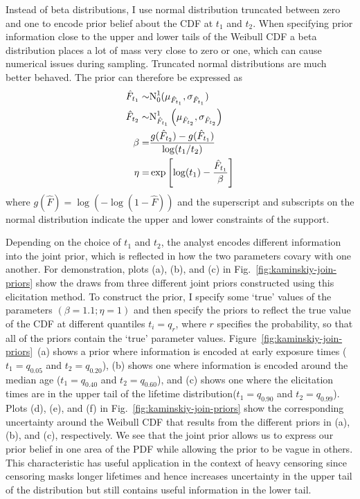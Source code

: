 Instead of beta distributions, I use normal distribution truncated between zero and one to encode prior belief about the CDF at $t_1$ and $t_2$. When specifying prior information close to the upper and lower tails of the Weibull CDF a beta distribution places a lot of mass very close to zero or one, which can cause numerical issues during sampling. Truncated normal distributions are much better behaved. The prior can therefore be expressed as
\begin{align*}
    \hat{F}_{t_1} \sim & \hbox{N}^{1}_{0}(\mu_{\hat{F}_{t_1}}, \sigma_{\hat{F}_{t_1}})             \\
    \hat{F}_{t_2} \sim & \hbox{N}^{1}_{\hat{F}_{t_1}}\left(\mu_{\hat{F}_{t_2}}, \sigma_{\hat{F}_{t_2}}\right) \\
    \beta            = & \frac{g(\hat{F}_{t_2}) - g(\hat{F}_{t_1})}{\log(t_1 / t_2)}               \\
    \eta             = & \exp\left[\log(t_1) - \frac{\hat{F}_{t_1}}{\beta}\right]
\end{align*}
where $g(\hat{F}) = \log(-\log(1 - \hat{F}))$ and the superscript and subscripts on the normal distribution indicate the upper and lower constraints of the support.

Depending on the choice of $t_1$ and $t_2$, the analyst encodes different information into the joint prior, which is reflected in how the two parameters covary with one another. For demonstration, plots (a), (b), and (c) in Fig.~\ref{fig:kaminskiy-join-priors} show the draws from three different joint priors constructed using this elicitation method. To construct the prior, I specify some `true' values of the parameters $(\beta = 1.1; \eta = 1)$ and then specify the priors to reflect the true value of the CDF at different quantiles $t_i = q_r$, where $r$ specifies the probability, so that all of the priors contain the `true' parameter values. Figure~\ref{fig:kaminskiy-join-priors}~(a) shows a prior where information is encoded at early exposure times ($t_1 = q_{0.05}$ and $t_2 = q_{0.20}$), (b) shows one where information is encoded around the median age ($t_1 = q_{0.40}$ and $t_2 = q_{0.60}$), and (c) shows one where the elicitation times are in the upper tail of the lifetime distribution($t_1 = q_{0.90}$ and $t_2 = q_{0.99}$). Plots (d), (e), and (f) in Fig.~\ref{fig:kaminskiy-join-priors} show the corresponding uncertainty around the Weibull CDF that results from the different priors in (a), (b), and (c), respectively. We see that the joint prior allows us to express our prior belief in one area of the PDF while allowing the prior to be vague in others. This characteristic has useful application in the context of heavy censoring since censoring masks longer lifetimes and hence increases uncertainty in the upper tail of the distribution but still contains useful information in the lower tail.

